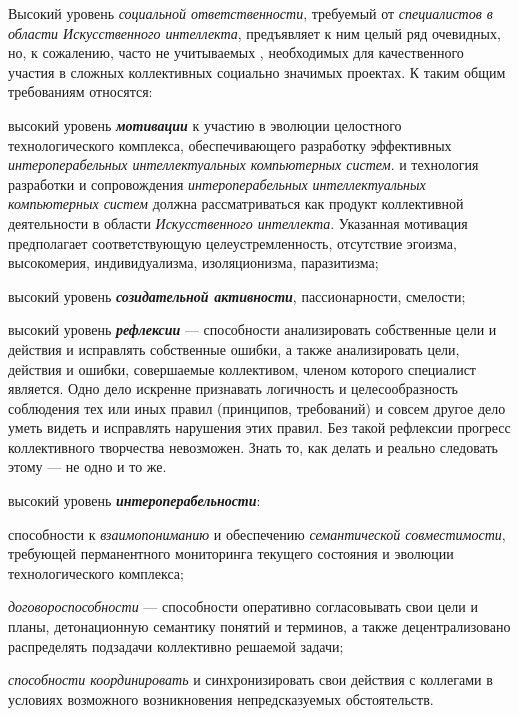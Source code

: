 Высокий уровень \textit{социальной ответственности}, требуемый от \textit{специалистов в области Искусственного интеллекта}, предъявляет к ним целый ряд очевидных, но, к сожалению, часто не учитываемых , необходимых для качественного участия в сложных коллективных социально значимых проектах. К таким общим требованиям относятся:

\begin{textitemize}
	\item  высокий уровень \textbf{\textit{мотивации}} к участию в  эволюции целостного технологического комплекса, обеспечивающего разработку эффективных \textit{интероперабельных интеллектуальных компьютерных систем}.  и  технология разработки и сопровождения \textit{интероперабельных интеллектуальных компьютерных систем} должна рассматриваться как  продукт коллективной деятельности в области \textit{Искусственного интеллекта}. Указанная мотивация предполагает соответствующую целеустремленность, отсутствие эгоизма, высокомерия, индивидуализма, изоляционизма, паразитизма;
	\medskip
	\item высокий уровень \textbf{\textit{созидательной активности}}, пассионарности, смелости;
	\medskip
	\item высокий уровень \textbf{\textit{рефлексии}} --- способности анализировать собственные цели и действия и исправлять собственные ошибки, а также анализировать цели, действия и ошибки, совершаемые коллективом, членом которого специалист является. Одно дело искренне признавать логичность и целесообразность соблюдения тех или иных правил (принципов, требований) и совсем другое дело уметь видеть и исправлять  нарушения этих правил. Без такой рефлексии прогресс коллективного творчества невозможен. Знать то, как  делать и реально следовать этому --- не одно и то же.
	\medskip
	\item высокий уровень \textbf{\textit{ интероперабельности}}:
	\begin{textitemize}
		\item способности к \textit{взаимопониманию} и обеспечению \textit{семантической совместимости}, требующей перманентного мониторинга текущего состояния и эволюции технологического комплекса;
		\item \textit{договороспособности} --- способности оперативно согласовывать свои цели и планы, детонационную семантику понятий и терминов, а также децентрализовано распределять подзадачи коллективно решаемой задачи;
		\item \textit{способности координировать} и синхронизировать свои действия с коллегами в условиях возможного возникновения непредсказуемых обстоятельств.
	\end{textitemize}
	

\end{textitemize}
